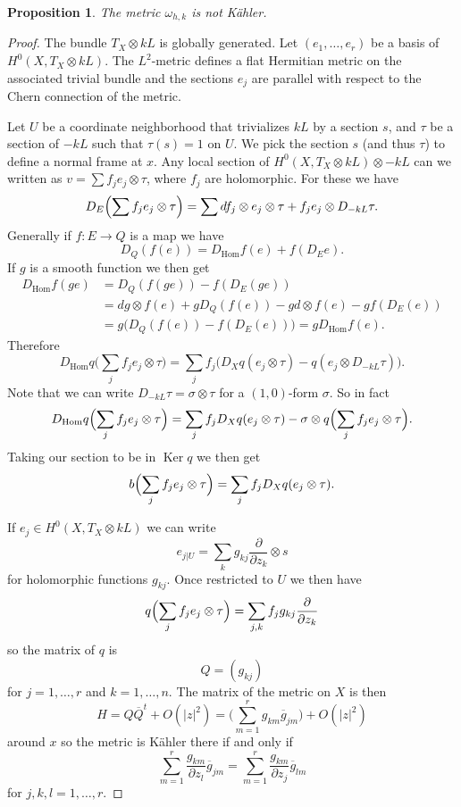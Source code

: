 \documentclass[12pt]{amsart}
\newtheorem{prop}[theo]{Proposition}
\theoremstyle{definition}
\def\ov#1{\overline{#1}}
\DeclareMathOperator{\Ker}{Ker}
\DeclareMathOperator{\Hom}{Hom}
\begin{document}
\begin{prop}
The metric $\omega_{h,k}$ is not K\"ahler.
\end{prop}

\begin{proof}
The bundle $T_X \otimes kL$ is globally generated.
Let $(e_1, \ldots, e_r)$ be a basis of $H^0(X,T_X \otimes kL)$.
The $L^2$-metric defines a flat Hermitian metric on the associated trivial bundle and the sections $e_j$ are parallel with respect to the Chern connection of the metric.

Let $U$ be a coordinate neighborhood that trivializes $kL$ by a section $s$, and $\tau$ be a section of $-kL$ such that $\tau(s) = 1$ on $U$.
We pick the section $s$ (and thus $\tau$) to define a normal frame at $x$.
Any local section of $H^0(X, T_X \otimes kL) \otimes -kL$ can we written as $v = \sum f_j e_j \otimes \tau$, where $f_j$ are holomorphic.
For these we have
\[
D_E\Bigl( \sum f_j e_j \otimes \tau \Bigr)
= \sum d f_j \otimes e_j \otimes \tau + f_j e_j \otimes D_{-kL} \tau.
\]
Generally if $f : E \to Q$ is a map we have
\[
D_Q(f(e))
= D_{\Hom}f(e) + f(D_E e).
\]
If $g$ is a smooth function we then get
\begin{align*}
D_{\Hom}f(ge)
&= D_Q(f(ge)) - f(D_E(ge))
\\
&= dg \otimes f(e) + g D_Q(f(e)) - gd \otimes f(e) - g f(D_E(e))
\\
&= g \bigl( D_Q(f(e)) - f(D_E(e)) \bigr)
= g D_{\Hom} f(e).
\end{align*}
Therefore
\[
D_{\Hom}q \biggl( \sum_j f_j e_j \otimes \tau \biggr)
= \sum_j f_j \bigl( D_X q(e_j \otimes \tau)
- q(e_j \otimes D_{-kL}\tau) \bigr).
\]
Note that we can write $D_{-kL}\tau = \sigma \otimes \tau$ for a $(1,0)$-form $\sigma$.
So in fact
\[
D_{\Hom}q \Bigl( \sum_j f_j e_j \otimes \tau \Bigr)
= \sum_j f_j D_X q(e_j \otimes \tau)
- \sigma \otimes q\Bigl(\sum_j f_j e_j \otimes \tau\Bigr).
\]
Taking our section to be in $\Ker q$ we then get
\[
b\Bigl( \sum_j f_j e_j \otimes \tau \Bigr)
= \sum_j f_j D_X q(e_j \otimes \tau).
\]



If $e_j \in H^0(X,T_X \otimes kL)$ we can write
\[
e_{j|U} = \sum_k g_{kj} \frac{\partial}{\partial z_k} \otimes s
\]
for holomorphic functions $g_{kj}$.
Once restricted to $U$ we then have
\[
q\Bigl(\sum_{j} f_j e_{j} \otimes \tau \Bigr) 
= \sum_{j,k} f_j g_{kj} \frac{\partial}{\partial z_k}
\]
so the matrix of $q$ is
\[
Q = (g_{kj})
\]
for $j = 1, \ldots, r$ and $k = 1, \ldots, n$.
The matrix of the metric on $X$ is then
\[
H = Q \ov Q^t + O(|z|^2)
= \biggl(
\sum_{m=1}^r g_{km} \ov g_{jm}
\biggr) + O(|z|^2)
\]
around $x$ so the metric is K\"ahler there if and only if
\[
\sum_{m=1}^r \frac{g_{km}}{\partial z_l} \ov g_{jm}
= \sum_{m=1}^r \frac{g_{km}}{\partial z_j} \ov g_{lm}
\]
for $j,k,l = 1,\ldots,r$.


\end{proof}
\end{document}
